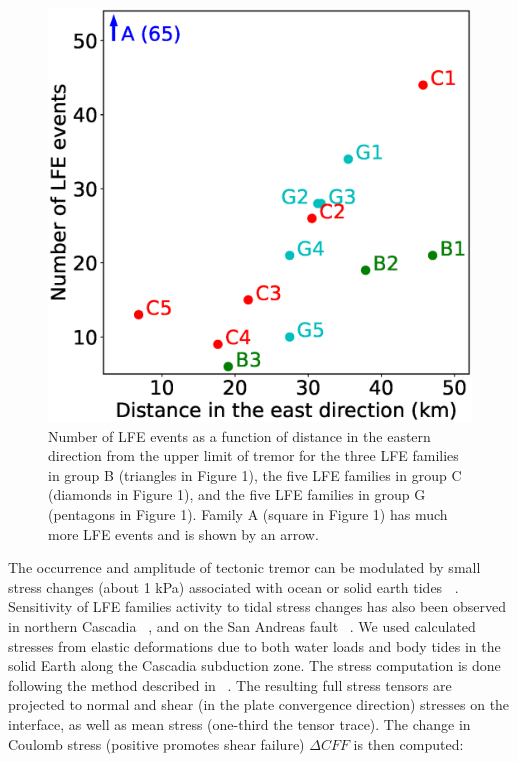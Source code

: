 \documentclass[draft]{agujournal2019}
\begin{document}
\begin{figure}
\noindent\includegraphics[width=\textwidth, trim={0cm 0cm 0cm 0cm},clip]{figures/nb_LFE_events.eps}
\caption{Number of LFE events as a function of distance in the eastern direction from the upper limit of tremor for the three LFE families in group B (triangles in Figure 1), the five LFE families in group C (diamonds in Figure 1), and the five LFE families in group G (pentagons in Figure 1). Family A (square in Figure 1) has much more LFE events and is shown by an arrow.}
\label{pngfiguresample}
\end{figure}

The occurrence and amplitude of tectonic tremor can be modulated by small stress changes (about 1 kPa) associated with ocean or solid earth tides \textbf{~\cite{SHE_2007_G3,HOU_2011,HOU_2015}}. Sensitivity of LFE families activity to tidal stress changes has also been observed in northern Cascadia ~\cite{ROY_2015}, and on the San Andreas fault ~\cite{THO_2012}. We used calculated stresses from elastic deformations due to both water loads and body tides in the solid Earth along the Cascadia subduction zone. The stress computation is done following the method described in ~. The resulting full stress tensors are projected to normal and shear (in the plate convergence direction) stresses on the interface, as well as mean stress (one-third the tensor trace). The change in Coulomb stress (positive promotes shear failure) $\Delta CFF$ is then computed:
\end{document}
